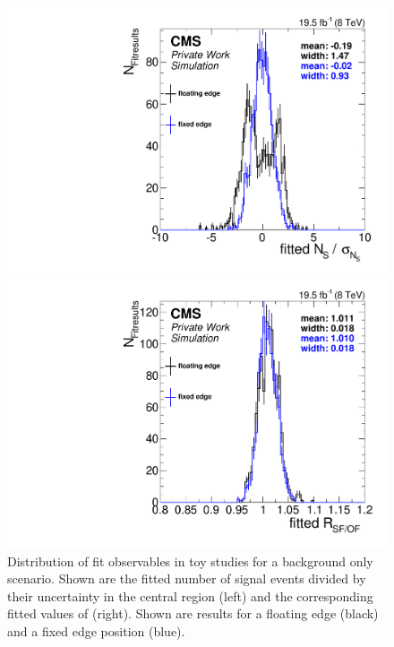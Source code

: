 \begin{figure}[hbp]
  \centering
  \begin{minipage}[t]{0.49\textwidth}
    \includegraphics[width=\textwidth]{plots/results/fit/toyResults/nS_floatVsFixed.pdf}
  \end{minipage}
  \begin{minipage}[t]{0.49\textwidth}
    \includegraphics[width=\textwidth]{plots/results/fit/toyResults/rSFOF_floatVsFixed.pdf}
  \end{minipage}

  \caption{Distribution of fit observables in toy studies for a background only scenario. Shown are the fitted number of signal events divided by their uncertainty in the central region (left) and the corresponding fitted values of \Rsfof (right). Shown are results for a floating edge (black) and a fixed edge position (blue).}
  \label{fig:toys:backgroundOnly}
\end{figure}

